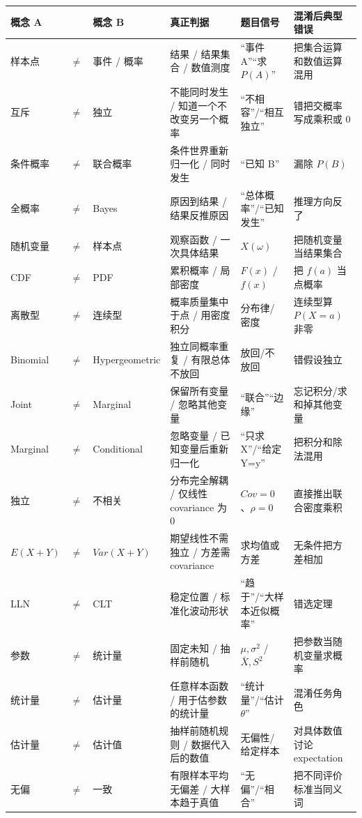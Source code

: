 \documentclass[11pt,a4paper,openany]{ctexbook}
\begin{document}
\begin{longtable}{L{2.2cm}@{}>{\centering\arraybackslash}p{0.5cm}@{}L{2.2cm}L{4.2cm}L{4.2cm}L{\dimexpr\linewidth-13.9cm\relax}}
\toprule
\textbf{概念 A} & & \textbf{概念 B} & \textbf{真正判据} & \textbf{题目信号} & \textbf{混淆后典型错误}\\
\midrule
样本点 & $\neq$ & 事件 / 概率 & 结果 / 结果集合 / 数值测度 & “事件 A”“求 $P(A)$” & 把集合运算和数值运算混用\\
互斥 & $\neq$ & 独立 & 不能同时发生 / 知道一个不改变另一个概率 & “不相容”/“相互独立” & 错把交概率写成乘积或 0\\
条件概率 & $\neq$ & 联合概率 & 条件世界重新归一化 / 同时发生 & “已知 B” & 漏除 $P(B)$\\
全概率 & $\neq$ & Bayes & 原因到结果 / 结果反推原因 & “总体概率”/“已知发生” & 推理方向反了\\
随机变量 & $\neq$ & 样本点 & 观察函数 / 一次具体结果 & $X(\omega)$ & 把随机变量当结果集合\\
CDF & $\neq$ & PDF & 累积概率 / 局部密度 & $F(x)$ / $f(x)$ & 把 $f(a)$ 当点概率\\
离散型 & $\neq$ & 连续型 & 概率质量集中于点 / 用密度积分 & 分布律/密度 & 连续型算 $P(X=a)$ 非零\\
Binomial & $\neq$ & Hypergeometric & 独立同概率重复 / 有限总体不放回 & 放回/不放回 & 错假设独立\\
Joint & $\neq$ & Marginal & 保留所有变量 / 忽略其他变量 & “联合”“边缘” & 忘记积分/求和掉其他变量\\
Marginal & $\neq$ & Conditional & 忽略变量 / 已知变量后重新归一化 & “只求 X”/“给定 Y=y” & 把积分和除法混用\\
独立 & $\neq$ & 不相关 & 分布完全解耦 / 仅线性 covariance 为 0 & $Cov=0$、$\rho=0$ & 直接推出联合密度乘积\\
$E(X+Y)$ & $\neq$ & $Var(X+Y)$ & 期望线性不需独立 / 方差需 covariance & 求均值或方差 & 无条件把方差相加\\
LLN & $\neq$ & CLT & 稳定位置 / 标准化波动形状 & “趋于”/“大样本近似概率” & 错选定理\\
参数 & $\neq$ & 统计量 & 固定未知 / 抽样前随机 & $\mu,\sigma^2$ / $\bar X,S^2$ & 把参数当随机变量求概率\\
统计量 & $\neq$ & 估计量 & 任意样本函数 / 用于估参数的统计量 & “统计量”/“估计 $\theta$” & 混淆任务角色\\
估计量 & $\neq$ & 估计值 & 抽样前随机规则 / 数据代入后的数值 & 无偏性/给定样本 & 对具体数值讨论 expectation\\
无偏 & $\neq$ & 一致 & 有限样本平均无偏差 / 大样本趋于真值 & “无偏”/“相合” & 把不同评价标准当同义词\\

\end{longtable}
\end{document}

